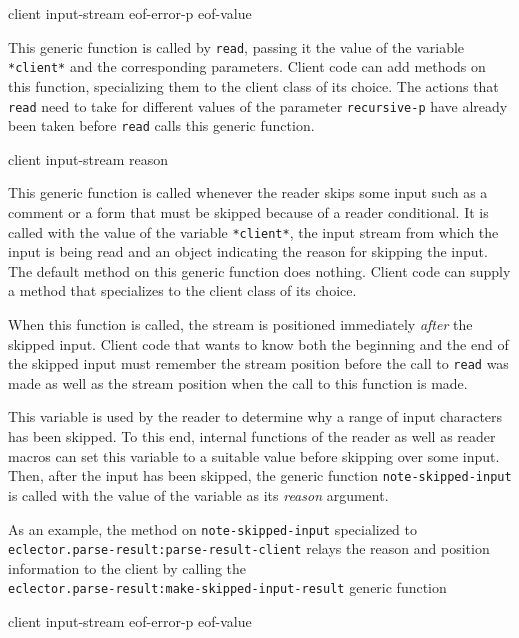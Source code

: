  {client input-stream eof-error-p eof-value}

This generic function is called by \texttt{read}, passing it the value
of the variable \texttt{*client*} and the corresponding parameters.
Client code can add methods on this function, specializing them to the
client class of its choice.  The actions that \texttt{read} need to
take for different values of the parameter \texttt{recursive-p} have
already been taken before \texttt{read} calls this generic function.

 {client input-stream reason}

This generic function is called whenever the reader skips some input
such as a comment or a form that must be skipped because of a reader
conditional.  It is called with the value of the variable
\texttt{*client*}, the input stream from which the input is being read
and an object indicating the reason for skipping the input.  The
default method on this generic function does nothing.  Client code can
supply a method that specializes to the client class of its choice.

When this function is called, the stream is positioned immediately
\emph{after} the skipped input.  Client code that wants to know both
the beginning and the end of the skipped input must remember the
stream position before the call to \texttt{read} was made as well as
the stream position when the call to this function is made.


This variable is used by the reader to determine why a range of input
characters has been skipped.  To this end, internal functions of the
reader as well as reader macros can set this variable to a suitable
value before skipping over some input.  Then, after the input has been
skipped, the generic function \texttt{note-skipped-input} is called
with the value of the variable as its \textit{reason} argument.

As an example, the method on \texttt{note-skipped-input} specialized
to\\
\texttt{eclector.parse-result:parse-result-client} relays the reason
and position information to the client by calling the\\
\texttt{eclector.parse-result:make-skipped-input-result} generic
function~

 {client input-stream eof-error-p eof-value}

